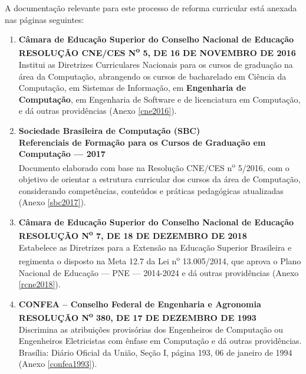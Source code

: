 A documentação relevante para este processo de reforma curricular está anexada nas páginas seguintes:

\begin{enumerate}
    \item \textbf{Câmara de Educação Superior do Conselho Nacional de Educação}  \\
          \textbf{RESOLUÇÃO CNE/CES N\textsuperscript{o} 5, DE 16 DE NOVEMBRO DE 2016}  \\
          Institui as Diretrizes Curriculares Nacionais para os cursos de graduação na área da Computação, abrangendo os cursos de bacharelado em Ciência da Computação, em Sistemas de Informação, em \textbf{Engenharia de Computação}, em Engenharia de Software e de licenciatura em Computação, e dá outras providências (Anexo \ref{cne2016}).

    \item \textbf{Sociedade Brasileira de Computação (SBC)}  \\
          \textbf{Referenciais de Formação para os Cursos de Graduação em Computação –-- 2017} \\
          Documento elaborado com base na Resolução CNE/CES n\textsuperscript{o} 5/2016, com o objetivo de orientar a estrutura curricular dos cursos da área de Computação, considerando competências, conteúdos e práticas pedagógicas atualizadas (Anexo \ref{sbc2017}).

    \item \textbf{Câmara de Educação Superior do Conselho Nacional de Educação}  \\
          \textbf{RESOLUÇÃO N\textsuperscript{o} 7, DE 18 DE DEZEMBRO DE 2018}  \\
          Estabelece as Diretrizes para a Extensão na Educação Superior Brasileira e regimenta o disposto na Meta 12.7 da Lei n\textsuperscript{o} 13.005/2014, que aprova o Plano Nacional de Educação –-- PNE –-- 2014-2024 e dá outras providências (Anexo \ref{rcne2018}).

    \item \textbf{CONFEA – Conselho Federal de Engenharia e Agronomia} \\
          \textbf{RESOLUÇÃO N\textsuperscript{o} 380, DE 17 DE DEZEMBRO DE 1993}  \\
          Discrimina as atribuições provisórias dos Engenheiros de Computação ou Engenheiros Eletricistas com ênfase em Computação e dá outras providências. Brasília: Diário Oficial da União, Seção I, página 193, 06 de janeiro de 1994 (Anexo \ref{confea1993}).
\end{enumerate}


